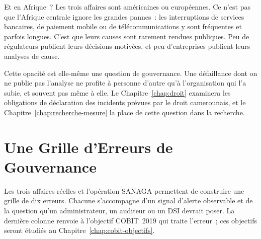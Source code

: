 \begin{boiteRemarque}{Et en Afrique~?}
Les trois affaires sont américaines ou européennes. Ce n'est pas que
l'Afrique centrale ignore les grandes pannes~: les interruptions de
services bancaires, de paiement mobile ou de télécommunications y sont
fréquentes et parfois longues. C'est que leurs causes sont rarement
rendues publiques. Peu de régulateurs publient leurs décisions motivées,
et peu d'entreprises publient leurs analyses de cause.

Cette opacité est elle-même une question de gouvernance. Une défaillance
dont on ne publie pas l'analyse ne profite à personne d'autre qu'à
l'organisation qui l'a subie, et souvent pas même à elle. Le
Chapitre~\ref{chap:droit} examinera les obligations de déclaration des
incidents prévues par le droit camerounais, et le
Chapitre~\ref{chap:recherche-mesure} la place de cette question dans la
recherche.
\end{boiteRemarque}

\section{Une Grille d'Erreurs de Gouvernance}
\label{sec:c02-grille}

Les trois affaires réelles et l'opération SANAGA permettent de construire
une grille de dix erreurs. Chacune s'accompagne d'un signal d'alerte
observable et de la question qu'un administrateur, un auditeur ou un DSI
devrait poser. La dernière colonne renvoie à l'objectif COBIT~2019 qui
traite l'erreur~; ces objectifs seront étudiés au
Chapitre~\ref{chap:cobit-objectifs}.

